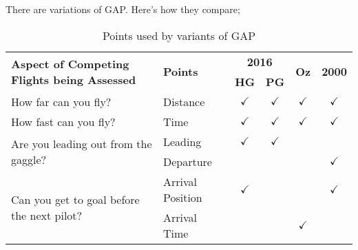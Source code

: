 \documentclass[gap.tex]{subfiles}
\begin{document}
There are variations of GAP. Here's how they compare;
\begin{table}[!ht]
    \begin{tabularx}{\textwidth}{|X|l|c|c|c|c|}
    \hline
         \multirow{2}{*}{\textbf{Aspect of Competing Flights being Assessed}}
         & \multirow{2}{*}{\textbf{Points}}
         & \multicolumn{2}{c|}{\textbf{2016}}
         & \multirow{2}{*}{\textbf{Oz}}
         & \multirow{2}{*}{\textbf{2000}}
         \\
    \cline{3-4}
         &
         & \textbf{HG}
         & \textbf{PG}
         &
         & \\
    \hline
        How far can you fly?
        & Distance
        & $\checkmark$
        & $\checkmark$
        & $\checkmark$
        & $\checkmark$
        \\
    \hline
        How fast can you fly?
        & Time
        & $\checkmark$
        & $\checkmark$
        & $\checkmark$
        & $\checkmark$
        \\
    \hline
        \multirow{2}{*}{Are you leading out from the gaggle?}
        & Leading
        & $\checkmark$
        & $\checkmark$
        &
        &
        \\
    \cline{2-6}
        & Departure
        &
        &
        &
        & $\checkmark$
        \\
    \hline
        \multirow{2}{*}{Can you get to goal before the next pilot?}
        & Arrival Position
        & $\checkmark$
        &
        &
        & $\checkmark$
        \\
    \cline{2-6}
        & Arrival Time
        &
        &
        & $\checkmark$
        &
        \\
    \hline
    \end{tabularx}
    \caption{Points used by variants of GAP}
    \label{tab:gap-variants}
\end{table}
\end{document}
